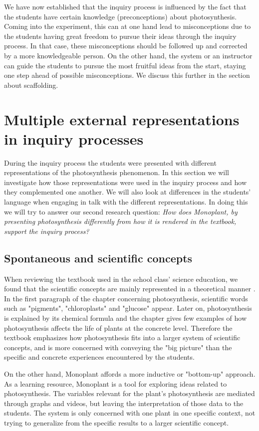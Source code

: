 We have now established that the inquiry process is influenced by the fact that the students have certain knowledge (preconceptions) about photosynthesis. Coming into the experiment, this can at one hand lead to misconceptions due to the students having great freedom to pursue their ideas through the inquiry process. In that case, these misconceptions should be followed up and corrected by a more knowledgeable person. On the other hand, the system or an instructor can guide the students to pursue the most fruitful ideas from the start, staying one step ahead of possible misconceptions. We discuss this further in the section about scaffolding.



\section{Multiple external representations in inquiry processes}
During the inquiry process the students were presented with different representations of the photosynthesis phenomenon. In this section we will investigate how those representations were used in the inquiry process and how they complemented one another. We will also look at differences in the students' language when engaging in talk with the different representations. In doing this we will try to answer our second research question: \emph{How does Monoplant, by presenting photosynthesis differently from how it is rendered in the textbook, support the inquiry process?}

\subsection{Spontaneous and scientific concepts}
When reviewing the textbook used in the school class' science education, we found that the scientific concepts are mainly represented in a theoretical manner \citep{bios}. In the first paragraph of the chapter concerning photosynthesis, scientific words such as "pigments", "chloroplasts" and "glucose" appear. Later on, photosynthesis is explained by its chemical formula and the chapter gives few examples of how photosynthesis affects the life of plants at the concrete level. Therefore the textbook emphasizes how photosynthesis fits into a larger system of scientific concepts, and is more concerned with conveying the "big picture" than the specific and concrete experiences encountered by the students. 

On the other hand, Monoplant affords a more inductive or "bottom-up" approach. As a learning resource, Monoplant is a tool for exploring ideas related to photosynthesis. The variables relevant for the plant's photosynthesis are mediated through graphs and videos, but leaving the interpretation of those data to the students. The system is only concerned with one plant in one specific context, not trying to generalize from the specific results to a larger scientific concept. 

